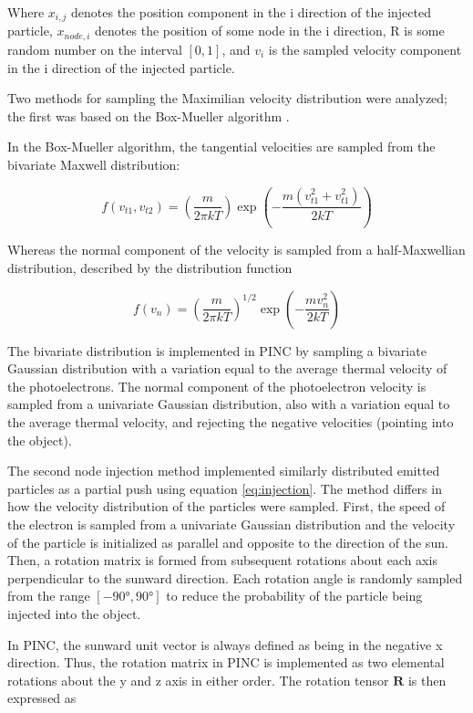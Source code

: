 Where $x_{i,j}$ denotes the position component in the i direction of the injected particle, $x_{node,i}$ denotes the position of some node in the i direction, R is some random number on the interval $[0,1]$, and $v_i$ is the sampled velocity component in the i direction of the injected particle.

Two methods for sampling the Maximilian velocity distribution were analyzed; the first was based on the Box-Mueller algorithm \parencite{Deca2013}.

In the Box-Mueller algorithm, the tangential velocities are sampled from the bivariate Maxwell distribution:

\begin{equation}\label{eq:bivariateMaxell}
    f(v_{t1}, v_{t2}) = \left(\frac{m}{2 \pi k T}  \right) \exp \left(- \frac{m (v^2_{t1} + v^2_{t1})}{2 k T} \right)
\end{equation}

Whereas the normal component of the velocity is sampled from a half-Maxwellian distribution, described by the distribution function

\begin{equation}\label{eq:halfMaxwell}
    f(v_n) = \left(\frac{m}{2 \pi k T}\right)^{1/2} \exp \left(- \frac{m v^2_n}{2 k T} \right)
\end{equation}

The bivariate distribution is implemented in PINC by sampling a bivariate Gaussian distribution with a variation equal to the average thermal velocity of the photoelectrons. The normal component of the photoelectron velocity is sampled from a univariate Gaussian distribution, also with a variation equal to the average thermal velocity, and rejecting the negative velocities (pointing into the object).

The second node injection method implemented similarly distributed emitted particles as a partial push using equation \eqref{eq:injection}. The method differs in how the velocity distribution of the particles were sampled. First, the speed of the electron is sampled from a univariate Gaussian distribution and the velocity of the particle is initialized as parallel and opposite to the direction of the sun. Then, a rotation matrix is formed from subsequent rotations about each axis perpendicular to the sunward direction. Each rotation angle is randomly sampled from the range $[\ang{-90}, \ang{90}]$ to reduce the probability of the particle being injected into the object.

In PINC, the sunward unit vector is always defined as being in the negative x direction. Thus, the rotation matrix in PINC is implemented as two elemental rotations about the y and z axis in either order. The rotation tensor $\pmb{R}$ is then expressed as

